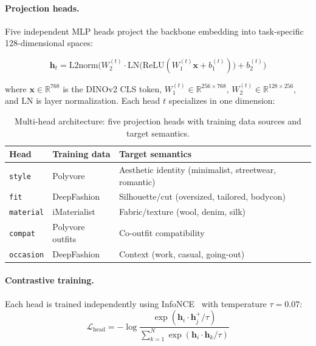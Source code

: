 \documentclass[10pt,twocolumn]{article}
\begin{document}
\paragraph{Projection heads.}
Five independent MLP heads project the backbone embedding into
task-specific 128-dimensional spaces:

\begin{equation}
  \mathbf{h}_t = \text{L2norm}\Big(
    W_2^{(t)} \cdot \text{LN}\big(
      \text{ReLU}(W_1^{(t)} \mathbf{x} + b_1^{(t)})
    \big) + b_2^{(t)}
  \Big)
\label{eq:head}
\end{equation}

\noindent where $\mathbf{x} \in \mathbb{R}^{768}$ is the DINOv2 CLS
token, $W_1^{(t)} \in \mathbb{R}^{256 \times 768}$,
$W_2^{(t)} \in \mathbb{R}^{128 \times 256}$, and $\text{LN}$ is
layer normalization.  Each head $t$ specializes in one dimension:

\begin{table}[t]
\centering
\small
\caption{Multi-head architecture: five projection heads with training
data sources and target semantics.}
\label{tab:heads}
\begin{tabular}{@{}llp{3.5cm}@{}}
\toprule
Head & Training data & Target semantics \\
\midrule
\texttt{style}    & Polyvore & Aesthetic identity (minimalist, streetwear, romantic) \\
\texttt{fit}      & DeepFashion & Silhouette/cut (oversized, tailored, bodycon) \\
\texttt{material} & iMaterialist & Fabric/texture (wool, denim, silk) \\
\texttt{compat}   & Polyvore outfits & Co-outfit compatibility \\
\texttt{occasion} & DeepFashion & Context (work, casual, going-out) \\
\bottomrule
\end{tabular}
\end{table}

\paragraph{Contrastive training.}
Each head is trained independently using InfoNCE~\citep{oord2018infonce}
with temperature $\tau = 0.07$:
\begin{equation}
  \mathcal{L}_{\text{head}} = -\log \frac{
    \exp(\mathbf{h}_i \cdot \mathbf{h}_j^+ / \tau)
  }{
    \sum_{k=1}^{N} \exp(\mathbf{h}_i \cdot \mathbf{h}_k / \tau)
  }
\label{eq:infonce}
\end{equation}
\end{document}
